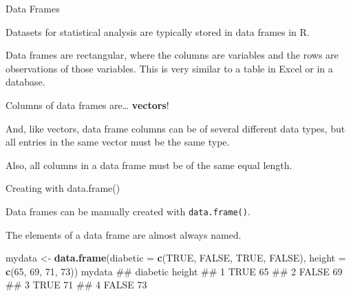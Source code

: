 \documentclass[ignorenonframetext,]{beamer}
\newenvironment{Shaded}{\begin{snugshade}}{\end{snugshade}}
\newcommand{\KeywordTok}[1]{\textcolor[rgb]{0.13,0.29,0.53}{\textbf{#1}}}
\newcommand{\DataTypeTok}[1]{\textcolor[rgb]{0.13,0.29,0.53}{#1}}
\newcommand{\DecValTok}[1]{\textcolor[rgb]{0.00,0.00,0.81}{#1}}
\newcommand{\StringTok}[1]{\textcolor[rgb]{0.31,0.60,0.02}{#1}}
\newcommand{\OtherTok}[1]{\textcolor[rgb]{0.56,0.35,0.01}{#1}}
\newcommand{\NormalTok}[1]{#1}
\begin{document}
\begin{frame}

\begin{block}{Data Frames}

Datasets for statistical analysis are typically stored in data frames in
R.

Data frames are rectangular, where the columns are variables and the
rows are observations of those variables. This is very similar to a
table in Excel or in a database.

\end{block}

\end{frame}

\begin{frame}

Columns of data frames are\ldots{} \textbf{vectors}!

And, like vectors, data frame columns can be of several different data
types, but all entries in the same vector must be the same type.

Also, all columns in a data frame must be of the same equal length.

\end{frame}

\begin{frame}[fragile]

\begin{block}{Creating with data.frame()}

Data frames can be manually created with \texttt{data.frame()}.

The elements of a data frame are almost always named.

\end{block}

\end{frame}

\begin{frame}[fragile]

\begin{Shaded}
\begin{Highlighting}[]
\NormalTok{mydata <-}\StringTok{ }\KeywordTok{data.frame}\NormalTok{(}\DataTypeTok{diabetic =} \KeywordTok{c}\NormalTok{(}\OtherTok{TRUE}\NormalTok{, }\OtherTok{FALSE}\NormalTok{, }\OtherTok{TRUE}\NormalTok{, }\OtherTok{FALSE}\NormalTok{), }
                     \DataTypeTok{height =} \KeywordTok{c}\NormalTok{(}\DecValTok{65}\NormalTok{, }\DecValTok{69}\NormalTok{, }\DecValTok{71}\NormalTok{, }\DecValTok{73}\NormalTok{))}
\NormalTok{mydata}
\NormalTok{##   diabetic height}
\NormalTok{## 1     TRUE     65}
\NormalTok{## 2    FALSE     69}
\NormalTok{## 3     TRUE     71}
\NormalTok{## 4    FALSE     73}
\end{Highlighting}
\end{Shaded}

\end{frame}
\end{document}
